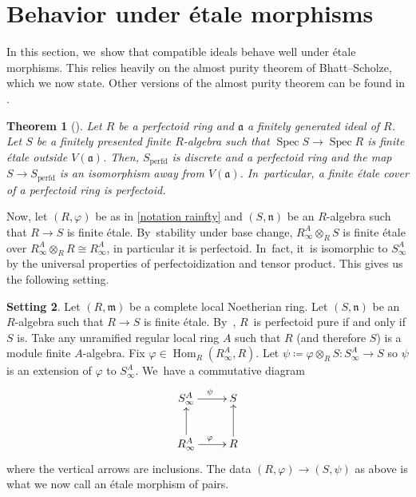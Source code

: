 \documentclass[11pt]{article}
\let\autoref\cref
\theoremstyle{plain}
\newtheorem{theorem}{Theorem}[section]
\theoremstyle{definition}
\newtheorem{setting}[theorem]{Setting}
\numberwithin{equation}{theorem}
\let\tensor\otimes
\newcommand{\fra}{\mathfrak{a}}
\newcommand{\fram}{\mathfrak{m}}
\newcommand{\fran}{\mathfrak{n}}
\DeclareMathOperator{\Hom}{Hom}
\DeclareMathOperator{\perfdd}{perfd}
\DeclareMathOperator{\Spec}{{Spec}}
\renewcommand{\phi}{\varphi}
\newcommand{\rphi}{(R,\phi)}
\newcommand{\spsi}{(S,\psi)}
\newcommand{\rafty}{R^A_\infty}
\newcommand{\safty}{S^A_\infty}
\begin{document}
\section{Behavior under étale morphisms}\label{section behavior étale morphisms}

In this section, we~show that compatible ideals behave well under étale morphisms. This relies heavily on the almost purity theorem of Bhatt--Scholze, which we now state. Other versions of the almost purity theorem can be found in \cite{FaltingsAlmostEtaleExtensions,ScholzePerfectoidSpaces,KedlayaLiuRelativeHodgeTheory,AndreLemmeAbhyankarPerfectoide}.

\begin{theorem}[{\cite[Th.\,10.9]{BhattScholzePrisms}}]
Let $R$ be a perfectoid ring and $\fra$ a finitely generated ideal of $R$. Let $S$ be a finitely presented finite $R$\nobreakdash-algebra such that $\Spec S\to \Spec R$ is finite étale outside $V(\fra)$. Then, $S_{\perfdd}$ is discrete and a perfectoid ring and the map $S\to S_{\perfdd}$ is an isomorphism away from $V(\fra)$. In~particular, a finite étale cover of a perfectoid ring is perfectoid.
\end{theorem}

Now, let $\rphi$ be as in \autoref{notation rainfty} and $(S,\fran)$ be an $R$\nobreakdash-algebra such that $R\to S$ is finite étale. By~stability under base change, $\rafty \tensor_{R} S $ is finite étale over $\rafty \tensor_{R} R \cong \rafty$, in particular it is perfectoid. In~fact, it~is isomorphic to $S^A_\infty$ by the universal properties of perfectoidization and tensor product. This gives us the following setting.

\begin{setting}\label{setting étale morphism}
Let $(R,\fram)$ be a complete local Noetherian ring. Let $(S,\fran)$ be an $R$\nobreakdash-algebra such that $R\to S$ is finite étale. By~\cite[Lem.\,4.6, Lem.\,4.15]{BMPSTWWPerfectoidPure}, $R$~is perfectoid pure if and only if $S$ is. Take any unramified regular local ring $A$ such that $R$ (and therefore $S$) is a module finite $A$-algebra.
Fix $\phi\in \Hom_R(\rafty,R)$.
Let $\psi\coloneqq \phi \tensor_{R} S\colon S^A_\infty\to S$ so $\psi$ is an extension of $\phi$ to $\safty$. We~have a commutative diagram
\begin{equation}\label{comm diag extension of pairs}
\begin{array}{c}
\xymatrix{
\safty \ar[r]^\psi & S \\
\rafty\ar[r]^\phi \ar[u]& R \ar[u].
}
\end{array}
\end{equation}
where the vertical arrows are inclusions. The data $\rphi\to \spsi$ as above is what we now call an étale morphism of pairs.
\end{setting}
\end{document}
